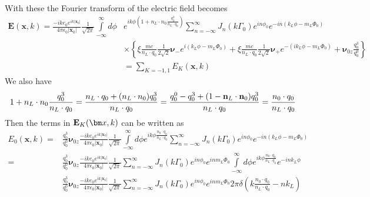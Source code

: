 With these the Fourier transform of the electric field becomes
\begin{align}
  {\bm E}({\bm x},k) =\frac{-i k e_0 e^{ik |{\bm x}_0|}}{4\pi\epsilon_0|{\bm x}_0|}\frac1{\sqrt{2\pi}}\int\limits_{-\infty}^{\infty}d\phi & e^{ik\phi(1+n_L\cdot n_0\frac{q_0^3}{n_L\cdot q_0})}\sum\limits_{n=-\infty}^{\infty}J_n(k\Gamma_0)e^{in\phi_0}e^{-in(k_L\phi-m_L\varPhi_0)}\nonumber \\& \times\left\{\xi\frac{mc}{n_L\cdot q_0}\frac1{2\sqrt{2}}{\boldsymbol{\nu}}_{-} e^{i(k_L\phi -m_L\varPhi_0)}+\xi\frac{mc}{n_L\cdot q_0}\frac1{2\sqrt{2}}{\boldsymbol{\nu}}_{+}e^{-(ik_L\phi -m_L\varPhi_0)}+{\boldsymbol{\nu}}_{0z}\frac{q_0^3}{q_0^0}\right\}\nonumber\\
  & =\sum\limits_{K=-1,1}E_K({\bm x},k)
\end{align}
We also have
\begin{align}
  1+n_L\cdot n_0\frac{q_0^3}{n_L\cdot q_0} = \frac{n_L\cdot q_0 +(n_L\cdot n_0){q_0^3}}{n_L\cdot q_0} = \frac{q_0^0-q_0^3+(1-{\bf n}_L\cdot{\bf n}_0)q_0^3}{n_L\cdot q_0} = \frac{n_0\cdot q_0}{n_L\cdot q_0}
\end{align}
Then the terms in ${\bf E}_K({\bm x},k)$ can be written as
\begin{align}
  E_0({\bm x},k) = & \frac{q_0^3}{q_0^0}{\boldsymbol{\nu}_{0z}}   \frac{-i k e_0 e^{ik |{\bm x}_0|}}{4\pi\epsilon_0|{\bm x}_0|}\frac1{\sqrt{2\pi}}\int\limits_{-\infty}^{\infty}d\phi  e^{ik\phi\frac{n_0\cdot q_0}{n_L\cdot q_0}}\sum\limits_{n=-\infty}^{\infty}J_n(k\Gamma_0)e^{in\phi_0}e^{-in(k_L\phi-m_L\varPhi_0)}\nonumber                                                                 \\
  =& \frac{q_0^3}{q_0^0}{\boldsymbol{\nu}_{0z}}   \frac{-i k e_0 e^{ik |{\bm x}_0|}}{4\pi\epsilon_0|{\bm x}_0|}\frac1{\sqrt{2\pi}}\sum\limits_{n=-\infty}^{\infty}J_n(k\Gamma_0)e^{in\phi_0}e^{inm_L\varPhi_0}\int\limits_{-\infty}^{\infty}d\phi  e^{ik\phi\frac{n_0\cdot q_0}{n_L\cdot q_0}}e^{-ink_L\phi}\nonumber                                                                 \\
  & \frac{q_0^3}{q_0^0}{\boldsymbol{\nu}_{0z}}   \frac{-i k e_0 e^{ik |{\bm x}_0|}}{4\pi\epsilon_0|{\bm x}_0|}\frac1{\sqrt{2\pi}}\sum\limits_{n=-\infty}^{\infty}J_n(k\Gamma_0)e^{in\phi_0}e^{inm_L\varPhi_0}2\pi\delta(k\frac{n_0\cdot q_0}{n_L\cdot q_0}-nk_L)
\end{align}

